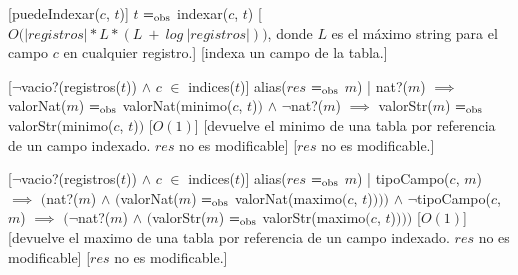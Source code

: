\begin{Interfaz}
  [puedeIndexar($c$, $t$)]
  {$t$ $=_{\mathrm{obs}}$ indexar($c$, $t$)}
  [$O\big(|registros| * L * (L\ +\ log\ |registros|)\big)$, donde $L$ es el máximo string para el campo $c$ en cualquier registro.]
  [indexa un campo de la tabla.]

  [$\neg$vacio?(registros($t$)) $\land$ $c$ $\in$ indices($t$)]
  {alias($res$ $=_{\mathrm{obs}}$ $m$) | nat?($m$) $\implies$ valorNat($m$) $=_{\mathrm{obs}}$ valorNat$\big($minimo($c$, $t$)$\big)$ $\land$ $\neg$nat?($m$) $\implies$ valorStr($m$) $=_{\mathrm{obs}}$ valorStr$\big($minimo($c$, $t$)$\big)$}
  [$O(1)$]
  [devuelve el minimo de una tabla por referencia de un campo indexado. $res$ no es modificable]
  [$res$ no es modificable.]

  [$\neg$vacio?(registros($t$)) $\land$ $c$ $\in$ indices($t$)]
  {alias($res$ $=_{\mathrm{obs}}$ $m$) | tipoCampo($c$, $m$) $\implies$ $\Big($nat?($m$) $\land$ $\big($valorNat($m$) $=_{\mathrm{obs}}$ valorNat(maximo$\big(c$, $t$)$\big)\big)\Big)$ $\land$ $\neg$tipoCampo($c$, $m$) $\implies$ $\Big(\neg$nat?($m$) $\land$ $\big($valorStr($m$) $=_{\mathrm{obs}}$ valorStr(maximo$\big(c$, $t$)$\big)\big)\Big)$}
  [$O(1)$]
  [devuelve el maximo de una tabla por referencia de un campo indexado. $res$ no es modificable]
  [$res$ no es modificable.]




\end{Interfaz}

